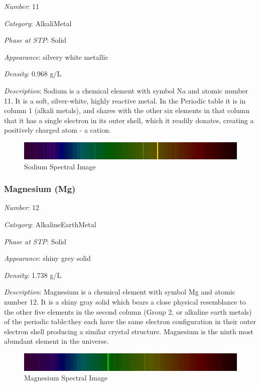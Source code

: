 \documentclass{article}
\begin{document}
\textit{Number}: 11

\textit{Category}: AlkaliMetal

\textit{Phase at STP}: Solid

\textit{Appearance}: silvery white metallic

\textit{Density}: 0.968 g/L

\textit{Description}: Sodium is a chemical element with symbol Na and atomic number 11. It is a soft, silver-white, highly reactive metal. In the Periodic table it is in column 1 (alkali metals), and shares with the other six elements in that column that it has a single electron in its outer shell, which it readily donates, creating a positively charged atom - a cation.

\immediate{}
\begin{figure}[!ht]
    \centering
    \includegraphics[width=12cm]{./resources/spectral_img/Sodium_Spectra.jpg}
    \caption{Sodium Spectral Image}
\end{figure}

\hypertarget{subsubsection::Mg}{}\subsubsection{Magnesium (Mg)}

\textit{Number}: 12

\textit{Category}: AlkalineEarthMetal

\textit{Phase at STP}: Solid

\textit{Appearance}: shiny grey solid

\textit{Density}: 1.738 g/L

\textit{Description}: Magnesium is a chemical element with symbol Mg and atomic number 12. It is a shiny gray solid which bears a close physical resemblance to the other five elements in the second column (Group 2, or alkaline earth metals) of the periodic table:they each have the same electron configuration in their outer electron shell producing a similar crystal structure. Magnesium is the ninth most abundant element in the universe.

\immediate{}
\begin{figure}[!ht]
    \centering
    \includegraphics[width=12cm]{./resources/spectral_img/Magnesium_Spectra.jpg}
    \caption{Magnesium Spectral Image}
\end{figure}
\end{document}
